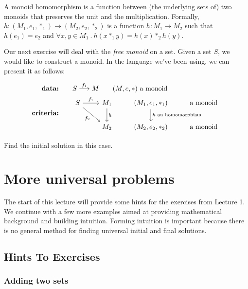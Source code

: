 A monoid homomorphism is a function between (the underlying sets of) two
monoids that preserves the unit and the multiplication. Formally,
$h : (M_1, e_1, \ast_1) \rightarrow (M_2, e_2, \ast_2)$ is a function
$h: M_1\to M_2$ such that $h(e_1) = e_2$ and
$\forall x, y \in M_1\ .\ h(x \ast_1 y) = h(x) \ast_2 h(y)$.

Our next exercise will deal with the \emph{free monoid} on a set.
Given a set $S$, we would like to construct a monoid. In the language we've
been using, we can present it as follows:

\begin{align*}
    \textbf{data:}\qquad& S \overset{f_1}{\longrightarrow}M
    \qquad \text{$(M,e,\ast)$ a monoid}\\
    \textbf{criteria:}\qquad& \begin{tikzcd}[ampersand replacement=\&]
        S \arrow[r, "f_1"] \arrow[dr, swap, "f_2"] \&
        M_1
        \arrow[d, "h"]
        \& (M_1,e_1,\ast_1)
        \arrow[d, "\text{$h$ an homomorphism}"]
        \& \text{a monoid}
        \\
        {}
        \& M_2 \& (M_2,e_2,\ast_2) \& \text{a monoid}
    \end{tikzcd}
\end{align*}

\begin{exercise}
    Find the initial solution in this case.
\end{exercise}


\chapter{More universal problems}

The start of this lecture will provide some hints for the exercises from
Lecture 1.  We continue with a few more examples aimed at providing
mathematical background and building intuition.  Forming intuition is
important because there is no general method for finding universal initial and
final solutions.

\section{Hints To Exercises}

\subsection{Adding two sets}

